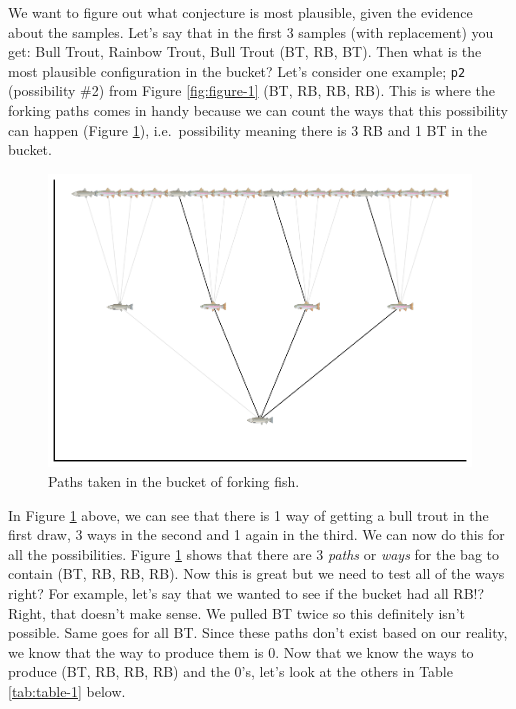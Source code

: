 \documentclass[
]{book}
\begin{document}
We want to figure out what conjecture is most plausible, given the evidence about the samples. Let's say that in the first 3 samples (with replacement) you get: Bull Trout, Rainbow Trout, Bull Trout (BT, RB, BT). Then what is the most plausible configuration in the bucket? Let's consider one example; \texttt{p2} (possibility \#2) from Figure \ref{fig:figure-1} (BT, RB, RB, RB). This is where the forking paths comes in handy because we can count the ways that this possibility can happen (Figure \ref{fig:figure-2}), i.e.~possibility meaning there is 3 RB and 1 BT in the bucket.

\begin{figure}
\centering
\includegraphics{bookdown-demo_files/figure-latex/figure-2-1.pdf}
\caption{\label{fig:figure-2}Paths taken in the bucket of forking fish.}
\end{figure}

In Figure \ref{fig:figure-2} above, we can see that there is 1 way of getting a bull trout in the first draw, 3 ways in the second and 1 again in the third. We can now do this for all the possibilities. Figure \ref{fig:figure-2} shows that there are 3 \emph{paths} or \emph{ways} for the bag to contain (BT, RB, RB, RB). Now this is great but we need to test all of the ways right? For example, let's say that we wanted to see if the bucket had all RB!? Right, that doesn't make sense. We pulled BT twice so this definitely isn't possible. Same goes for all BT. Since these paths don't exist based on our reality, we know that the way to produce them is 0. Now that we know the ways to produce (BT, RB, RB, RB) and the 0's, let's look at the others in Table \ref{tab:table-1} below.
\end{document}
